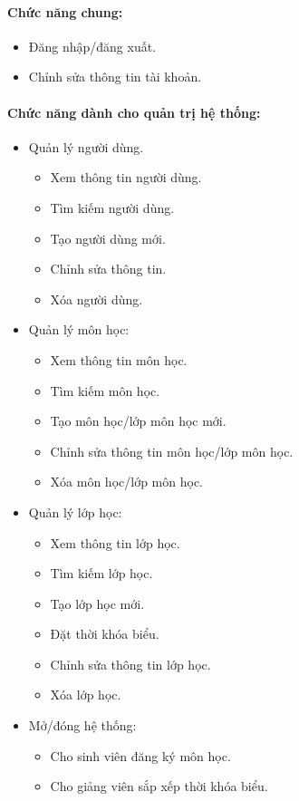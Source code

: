 \documentclass[12pt]{article}
\begin{document}
    \paragraph{Chức năng chung:}
    \begin{itemize}
      \item Đăng nhập/đăng xuất.
      \item Chỉnh sửa thông tin tài khoản.
    \end{itemize}

    \paragraph{Chức năng dành cho quản trị hệ thống:}
    \begin{itemize}
      \item Quản lý người dùng.
      \begin{itemize}
        \item Xem thông tin người dùng.
        \item Tìm kiếm người dùng.
        \item Tạo người dùng mới.
        \item Chỉnh sửa thông tin.
        \item Xóa người dùng.
      \end{itemize}
      \item Quản lý môn học:
      \begin{itemize}
        \item Xem thông tin môn học.
        \item Tìm kiếm môn học.
        \item Tạo môn học/lớp môn học mới.
        \item Chỉnh sửa thông tin môn học/lớp môn học.
        \item Xóa môn học/lớp môn học.
      \end{itemize}
      \item Quản lý lớp học:
      \begin{itemize}
        \item Xem thông tin lớp học.
        \item Tìm kiếm lớp học.
        \item Tạo lớp học mới.
        \item Đặt thời khóa biểu.
        \item Chỉnh sửa thông tin lớp học.
        \item Xóa lớp học.
      \end{itemize}
      \item Mở/đóng hệ thống:
      \begin{itemize}
        \item Cho sinh viên đăng ký môn học.
        \item Cho giảng viên sắp xếp thời khóa biểu.
      \end{itemize}
    \end{itemize}
\end{document}
